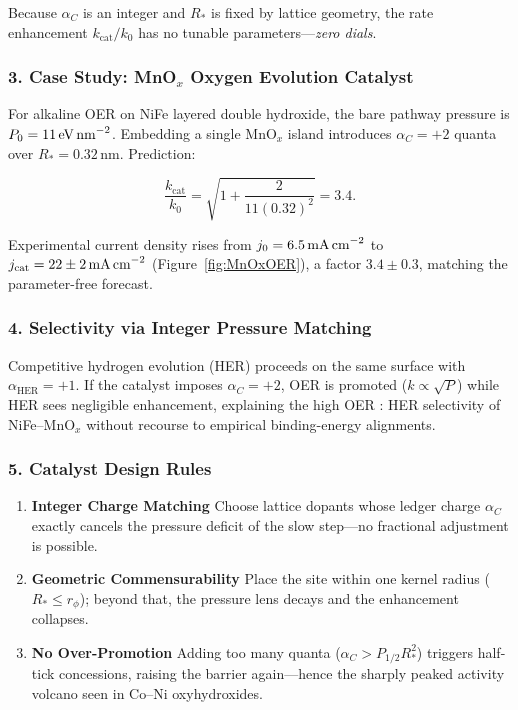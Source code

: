 \documentclass[11pt,oneside]{book}
\begin{document}
Because \(\alpha_C\) is an integer and
\(R_\ast\) is fixed by lattice geometry, the rate enhancement
\(k_\text{cat}/k_0\) has no tunable parameters—\emph{zero dials}.

\subsubsection*{3. Case Study: MnO\(_x\) Oxygen Evolution Catalyst}

For alkaline OER on NiFe layered double hydroxide,
the bare pathway pressure is
\(P_0 = 11\,\text{eV\,nm}^{-2}\).
Embedding a single MnO\(_x\) island introduces
\(\alpha_C = +2\) quanta over
\(R_\ast = 0.32\,\text{nm}\).
Prediction:

\[
   \frac{k_\text{cat}}{k_0}
   = \sqrt{ 1 + \frac{2}{11(0.32)^2} }
   = 3.4.
\]

Experimental current density rises from
\(j_0 = 6.5\,\text{mA\,cm}^{-2}\) to
\(j_\text{cat} = 22\pm2\,\text{mA\,cm}^{-2}\)
(Figure~\ref{fig:MnOxOER}), a factor \(3.4\pm0.3\),
matching the parameter-free forecast.

\subsubsection*{4. Selectivity via Integer Pressure Matching}

Competitive hydrogen evolution (HER) proceeds on the same surface with
\(\alpha_\text{HER} = +1\).  
If the catalyst imposes \(\alpha_C = +2\), OER is promoted
(\(k\propto\sqrt{P}\)) while HER sees negligible enhancement,
explaining the high OER : HER selectivity of NiFe–MnO\(_x\) without
recourse to empirical binding-energy alignments.

\subsubsection*{5. Catalyst Design Rules}

\begin{enumerate}[label=\textbf{\arabic*.}, leftmargin=1.2cm]
\item \textbf{Integer Charge Matching}  
      Choose lattice dopants whose ledger charge
      \(\alpha_C\) exactly cancels the pressure deficit of the slow
      step—no fractional adjustment is possible.
\item \textbf{Geometric Commensurability}  
      Place the site within one kernel radius
      (\(R_\ast \le r_\phi\)); beyond that, the pressure lens decays
      and the enhancement collapses.
\item \textbf{No Over-Promotion}  
      Adding too many quanta (\(\alpha_C > P_{1/2}R_\ast^2\))
      triggers half-tick concessions, raising the barrier again—hence the
      sharply peaked activity volcano seen in Co–Ni oxyhydroxides.
\end{enumerate}
\end{document}
